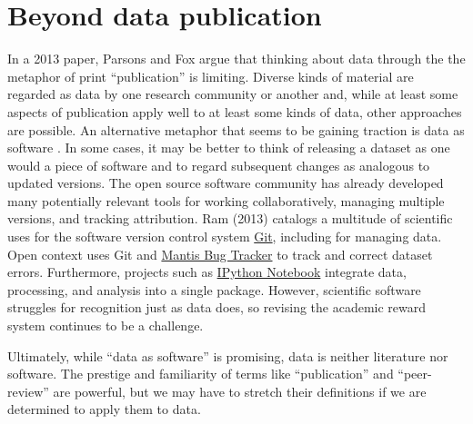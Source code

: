 \documentclass[10pt,twocolumn]{article}
\begin{document}
\section*{Beyond data publication}\label{beyond-data-publication}

In a 2013 paper\cite{parsons_is_2013}, Parsons and Fox argue that thinking about data through the the metaphor of print ``publication'' is limiting.
Diverse kinds of material are regarded as data by one research community or another and, while at least some aspects of publication apply well to at least some kinds of data, other approaches are possible.
An alternative metaphor that seems to be gaining traction is data as software \cite{schopf_treating_2012}.
In some cases, it may be better to think of releasing a dataset as one would a piece of software and to regard subsequent changes as analogous to updated versions.
The open source software community has already developed many potentially relevant tools for working collaboratively, managing multiple versions, and tracking attribution.
Ram (2013)\cite{ram_git_2013} catalogs a multitude of scientific uses for the software version control system \href{http://git-scm.com/}{Git}, including for managing data.
Open context uses Git and \href{http://www.mantisbt.org/}{Mantis Bug Tracker} to track and correct dataset errors.
Furthermore, projects such as \href{http://ipython.org/notebook}{IPython Notebook} integrate data, processing, and analysis into a single package.
However, scientific software struggles for recognition\cite{pradal_publishing_2013} just as data does, so revising the academic reward system continues to be a challenge.

Ultimately, while ``data as software'' is promising, data is neither literature nor software.
The prestige and familiarity of terms like ``publication'' and ``peer-review'' are powerful, but we may have to stretch their definitions if we are determined to apply them to data.

{\small
}








\end{document}
